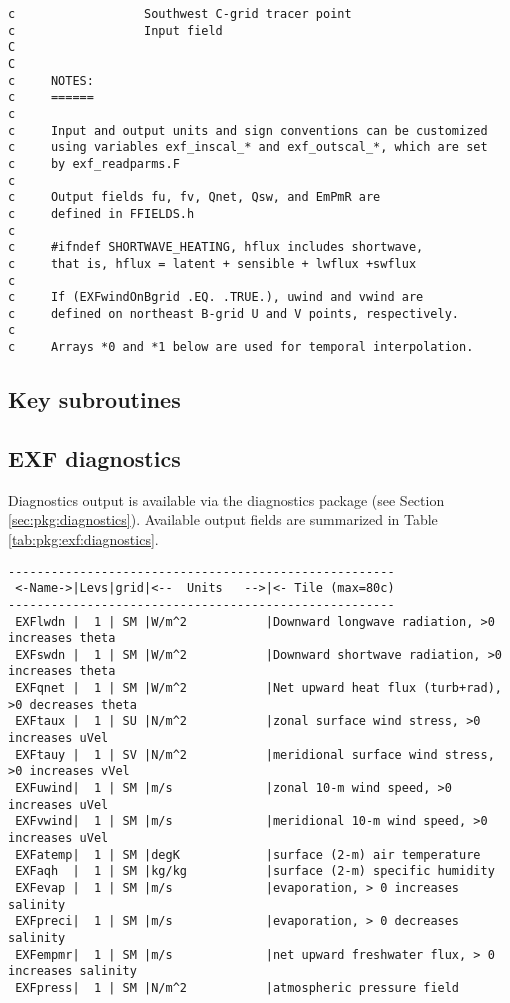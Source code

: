 {\begin{verbatim}
c                  Southwest C-grid tracer point
c                  Input field
C
C
c     NOTES:
c     ======
c
c     Input and output units and sign conventions can be customized
c     using variables exf_inscal_* and exf_outscal_*, which are set
c     by exf_readparms.F
c
c     Output fields fu, fv, Qnet, Qsw, and EmPmR are
c     defined in FFIELDS.h
c
c     #ifndef SHORTWAVE_HEATING, hflux includes shortwave,
c     that is, hflux = latent + sensible + lwflux +swflux
c
c     If (EXFwindOnBgrid .EQ. .TRUE.), uwind and vwind are
c     defined on northeast B-grid U and V points, respectively.
c
c     Arrays *0 and *1 below are used for temporal interpolation.
\end{verbatim}
}


\subsection{Key subroutines
\label{sec:pkg:exf:subroutines}}


\subsection{EXF diagnostics
\label{sec:pkg:exf:diagnostics}}

Diagnostics output is available via the diagnostics package
(see Section \ref{sec:pkg:diagnostics}).
Available output fields are summarized in 
Table \ref{tab:pkg:exf:diagnostics}.

\begin{table}
\label{tab:pkg:exf:diagnostics}
\caption{~}
{\footnotesize
\begin{verbatim}
------------------------------------------------------
 <-Name->|Levs|grid|<--  Units   -->|<- Tile (max=80c)
------------------------------------------------------
 EXFlwdn |  1 | SM |W/m^2           |Downward longwave radiation, >0 increases theta
 EXFswdn |  1 | SM |W/m^2           |Downward shortwave radiation, >0 increases theta
 EXFqnet |  1 | SM |W/m^2           |Net upward heat flux (turb+rad), >0 decreases theta
 EXFtaux |  1 | SU |N/m^2           |zonal surface wind stress, >0 increases uVel
 EXFtauy |  1 | SV |N/m^2           |meridional surface wind stress, >0 increases vVel
 EXFuwind|  1 | SM |m/s             |zonal 10-m wind speed, >0 increases uVel
 EXFvwind|  1 | SM |m/s             |meridional 10-m wind speed, >0 increases uVel
 EXFatemp|  1 | SM |degK            |surface (2-m) air temperature
 EXFaqh  |  1 | SM |kg/kg           |surface (2-m) specific humidity
 EXFevap |  1 | SM |m/s             |evaporation, > 0 increases salinity
 EXFpreci|  1 | SM |m/s             |evaporation, > 0 decreases salinity
 EXFempmr|  1 | SM |m/s             |net upward freshwater flux, > 0 increases salinity
 EXFpress|  1 | SM |N/m^2           |atmospheric pressure field
\end{verbatim}
}
\end{table}

